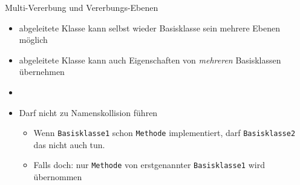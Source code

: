 
\begin{frame}[fragile]{Multi-Vererbung und Vererbungs-Ebenen}
%
\begin{itemize}
\item abgeleitete Klasse kann selbst wieder Basisklasse sein \Thus mehrere Ebenen möglich
\item abgeleitete Klasse kann auch Eigenschaften von \emph{mehreren} Basisklassen übernehmen
\item {}
\item Darf nicht zu Namenskollision führen
	\begin{itemize}
	\item[\Thus] Wenn \texttt{Basisklasse1} schon \texttt{Methode} implementiert, darf \texttt{Basisklasse2} das nicht auch tun.
	\item[\Thus] Falls doch: nur \texttt{Methode} von erstgenannter \texttt{Basisklasse1} wird übernommen
	\end{itemize}
\end{itemize}
%
\end{frame}


